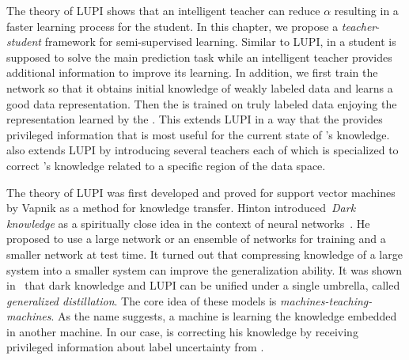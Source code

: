 The theory of LUPI shows that an intelligent teacher can reduce $\alpha$ resulting in a faster learning process for the student. In this chapter, we propose a \emph{teacher}-\emph{student} framework for semi-supervised learning. Similar to LUPI, in \fwl a student is supposed to solve the main prediction task while an intelligent teacher provides additional information to improve its learning. In addition, we first train the \std network so that it obtains initial knowledge of weakly labeled data and learns a good data representation. Then the \tch is trained on truly labeled data enjoying the representation learned by the \std. This extends LUPI in a way that the \tch provides privileged information that is most useful for the current state of \std's knowledge. \fwl also extends LUPI by introducing several teachers each of which is specialized to correct \std's knowledge related to a specific region of the data space.


The theory of LUPI was first developed and proved for support vector machines by Vapnik as a method for knowledge transfer. Hinton introduced~\emph{Dark knowledge} as a spiritually close idea in the context of neural networks~\citep{Hinton:2006}. He proposed to use a large network or an ensemble of networks for training and a smaller network at test time. It turned out that compressing knowledge of a large system into a smaller system can improve the generalization ability. It was shown 
in~\citep{lopez:2015} that dark knowledge and LUPI can be unified under a single umbrella, called \emph{generalized distillation}. The core idea of these models is \emph{machines-teaching-machines}. As the name suggests, a machine is learning the knowledge embedded in another machine. In our case, \std is correcting his knowledge by receiving privileged information about label uncertainty from \tch. 


